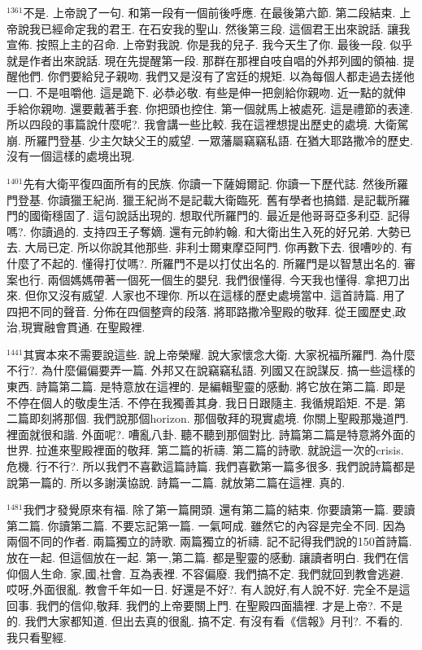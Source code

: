 \documentclass{book}
\begin{document}
$^{1361}$不是.
上帝說了一句.
和第一段有一個前後呼應.
在最後第六節.
第二段結束.
上帝說我已經命定我的君王.
在石安我的聖山.
然後第三段.
這個君王出來說話.
讓我宣佈.
按照上主的召命.
上帝對我說.
你是我的兒子.
我今天生了你.
最後一段.
似乎就是作者出來說話.
現在先提醒第一段.
那群在那裡自吱自唱的外邦列國的領袖.
提醒他們.
你們要給兒子親吻.
我們又是沒有了宮廷的規矩.
以為每個人都走過去搓他一口.
不是咀嚼他.
這是跪下.
必恭必敬.
有些是伸一把劍給你親吻.
近一點的就伸手給你親吻.
還要戴著手套.
你把頭也控住.
第一個就馬上被處死.
這是禮節的表達.
所以四段的事篇說什麼呢?.
我會講一些比較.
我在這裡想提出歷史的處境.
大衛駕崩.
所羅門登基.
少主欠缺父王的威望.
一眾藩屬竊竊私語.
在猶大耶路撒冷的歷史.
沒有一個這樣的處境出現.

$^{1401}$先有大衛平復四面所有的民族.
你讀一下薩姆爾記.
你讀一下歷代誌.
然後所羅門登基.
你讀獵王紀尚.
獵王紀尚不是記載大衛臨死.
舊有學者也搞錯.
是記載所羅門的國衛穩固了.
這句說話出現的.
想取代所羅門的.
最近是他哥哥亞多利亞.
記得嗎?.
你讀過的.
支持四王子奪嫡.
還有元帥約翰.
和大衛出生入死的好兄弟.
大勢已去.
大局已定.
所以你說其他那些.
非利士爾東摩亞阿門.
你再數下去.
很嘈吵的.
有什麼了不起的.
懂得打仗嗎?.
所羅門不是以打仗出名的.
所羅門是以智慧出名的.
審案也行.
兩個媽媽帶著一個死一個生的嬰兒.
我們很懂得.
今天我也懂得.
拿把刀出來.
但你又沒有威望.
人家也不理你.
所以在這樣的歷史處境當中.
這首詩篇.
用了四把不同的聲音.
分佈在四個整齊的段落.
將耶路撒冷聖殿的敬拜.
從王國歷史,政治,現實融會貫通.
在聖殿裡.

$^{1441}$其實本來不需要說這些.
說上帝榮耀.
說大家懷念大衛.
大家祝福所羅門.
為什麼不行?.
為什麼偏偏要弄一篇.
外邦又在說竊竊私語.
列國又在說謀反.
搞一些這樣的東西.
詩篇第二篇.
是特意放在這裡的.
是編輯聖靈的感動.
將它放在第二篇.
即是不停在個人的敬虔生活.
不停在我獨善其身.
我日日跟隨主.
我循規蹈矩.
不是.
第二篇即刻將那個.
我們說那個horizon.
那個敬拜的現實處境.
你關上聖殿那幾道門.
裡面就很和諧.
外面呢?.
嘈亂八卦.
聽不聽到那個對比.
詩篇第二篇是特意將外面的世界.
拉進來聖殿裡面的敬拜.
第二篇的祈禱.
第二篇的詩歌.
就說這一次的crisis.
危機.
行不行?.
所以我們不喜歡這篇詩篇.
我們喜歡第一篇多很多.
我們說詩篇都是說第一篇的.
所以多謝漢協說.
詩篇一二篇.
就放第二篇在這裡.
真的.

$^{1481}$我們才發覺原來有福.
除了第一篇開頭.
還有第二篇的結束.
你要讀第一篇.
要讀第二篇.
你讀第二篇.
不要忘記第一篇.
一氣呵成.
雖然它的內容是完全不同.
因為兩個不同的作者.
兩篇獨立的詩歌.
兩篇獨立的祈禱.
記不記得我們說的150首詩篇.
放在一起.
但這個放在一起.
第一,第二篇.
都是聖靈的感動.
讓讀者明白.
我們在信仰個人生命.
家,國,社會.
互為表裡.
不容偏廢.
我們搞不定.
我們就回到教會逃避.
哎呀,外面很亂.
教會千年如一日.
好還是不好?.
有人說好,有人說不好.
完全不是這回事.
我們的信仰,敬拜.
我們的上帝要關上門.
在聖殿四面牆裡.
才是上帝?.
不是的.
我們大家都知道.
但出去真的很亂.
搞不定.
有沒有看《信報》月刊?.
不看的.
我只看聖經.
\end{document}
